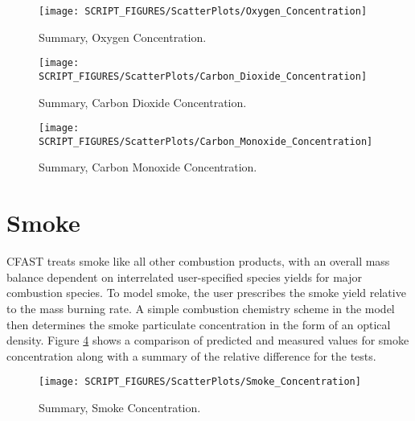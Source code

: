 \begin{figure}
\texttt{[image: SCRIPT\_FIGURES/ScatterPlots/Oxygen\_Concentration]}
\caption[Summary, Oxygen Concentration]
{Summary, Oxygen Concentration.}
\label{fig:Species_Scatter}
\end{figure}

\begin{figure}
\texttt{[image: SCRIPT\_FIGURES/ScatterPlots/Carbon\_Dioxide\_Concentration]}
\caption[Summary, Carbon Dioxide Concentration]
{Summary, Carbon Dioxide Concentration.}
\label{fig:Species_Scatter2}
\end{figure}

\begin{figure}
\texttt{[image: SCRIPT\_FIGURES/ScatterPlots/Carbon\_Monoxide\_Concentration]}
\caption[Summary, Carbon Monoxide Concentration]
{Summary, Carbon Monoxide Concentration.}
\label{fig:Species_Scatter3}
\end{figure}


\section{Smoke}

CFAST treats smoke like all other combustion products, with an overall mass balance dependent on interrelated user-specified species yields for major combustion species.  To model smoke, the user prescribes the smoke yield relative to the mass burning rate.  A simple combustion chemistry scheme in the model then determines the smoke particulate concentration in the form of an optical density.  Figure \ref{fig:Smoke_Scatter} shows a comparison of predicted and measured values for smoke concentration along with a summary of the relative difference for the tests.
\label{Smoke Concentration}

\begin{figure}
\begin{center}
\texttt{[image: SCRIPT\_FIGURES/ScatterPlots/Smoke\_Concentration]}
\end{center}
\caption[Summary, Smoke Concentration]{Summary, Smoke Concentration.} \label{fig:Smoke_Scatter}
\end{figure}
